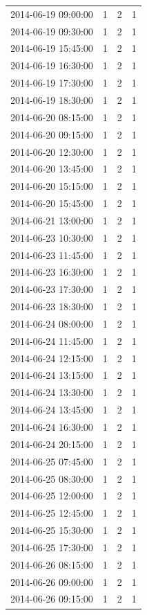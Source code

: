 \begin{tabular}{lrrr}
2014-06-19 09:00:00 & 1 & 2 & 1 \\
2014-06-19 09:30:00 & 1 & 2 & 1 \\
2014-06-19 15:45:00 & 1 & 2 & 1 \\
2014-06-19 16:30:00 & 1 & 2 & 1 \\
2014-06-19 17:30:00 & 1 & 2 & 1 \\
2014-06-19 18:30:00 & 1 & 2 & 1 \\
2014-06-20 08:15:00 & 1 & 2 & 1 \\
2014-06-20 09:15:00 & 1 & 2 & 1 \\
2014-06-20 12:30:00 & 1 & 2 & 1 \\
2014-06-20 13:45:00 & 1 & 2 & 1 \\
2014-06-20 15:15:00 & 1 & 2 & 1 \\
2014-06-20 15:45:00 & 1 & 2 & 1 \\
2014-06-21 13:00:00 & 1 & 2 & 1 \\
2014-06-23 10:30:00 & 1 & 2 & 1 \\
2014-06-23 11:45:00 & 1 & 2 & 1 \\
2014-06-23 16:30:00 & 1 & 2 & 1 \\
2014-06-23 17:30:00 & 1 & 2 & 1 \\
2014-06-23 18:30:00 & 1 & 2 & 1 \\
2014-06-24 08:00:00 & 1 & 2 & 1 \\
2014-06-24 11:45:00 & 1 & 2 & 1 \\
2014-06-24 12:15:00 & 1 & 2 & 1 \\
2014-06-24 13:15:00 & 1 & 2 & 1 \\
2014-06-24 13:30:00 & 1 & 2 & 1 \\
2014-06-24 13:45:00 & 1 & 2 & 1 \\
2014-06-24 16:30:00 & 1 & 2 & 1 \\
2014-06-24 20:15:00 & 1 & 2 & 1 \\
2014-06-25 07:45:00 & 1 & 2 & 1 \\
2014-06-25 08:30:00 & 1 & 2 & 1 \\
2014-06-25 12:00:00 & 1 & 2 & 1 \\
2014-06-25 12:45:00 & 1 & 2 & 1 \\
2014-06-25 15:30:00 & 1 & 2 & 1 \\
2014-06-25 17:30:00 & 1 & 2 & 1 \\
2014-06-26 08:15:00 & 1 & 2 & 1 \\
2014-06-26 09:00:00 & 1 & 2 & 1 \\
2014-06-26 09:15:00 & 1 & 2 & 1 \\

\end{tabular}
